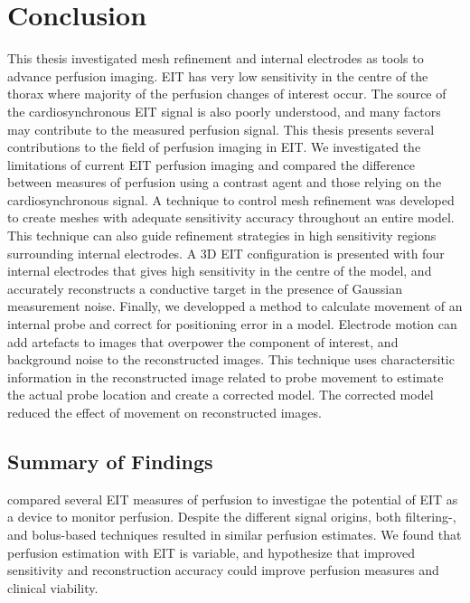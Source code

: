 \chapter{Conclusion}

This thesis investigated mesh refinement and internal electrodes 
as tools to advance perfusion imaging. 
EIT has very low sensitivity in the centre of the thorax where 
majority of the perfusion changes of interest occur. 
The source of the cardiosynchronous EIT signal is also 
poorly understood, and many factors may contribute to 
the measured perfusion signal. 
This thesis presents several contributions to the field of 
perfusion imaging in EIT.
We investigated the limitations of current EIT perfusion imaging
and compared the difference between measures of perfusion using 
a contrast agent and those relying on the cardiosynchronous signal.
A technique to control mesh refinement was developed to create meshes
with adequate sensitivity accuracy throughout an entire model. This 
technique can also guide refinement strategies in high sensitivity regions  
surrounding internal electrodes. 
A 3D EIT configuration is presented with four internal electrodes that gives high
sensitivity in the centre of the model, and accurately reconstructs a conductive
target in the presence of Gaussian measurement noise.
Finally, we developped a method to calculate movement of 
an internal probe and correct for positioning error in a model. Electrode 
motion can add artefacts
to images that overpower the 
component of interest, and background noise to the reconstructed images. 
This technique uses charactersitic information in the reconstructed 
image related to probe movement to estimate the actual probe location 
and create a corrected model. The corrected model 
reduced the effect of movement on reconstructed images. 

\section{Summary of Findings}

 compared several EIT measures of perfusion 
to investigae the potential of EIT as a device to monitor 
perfusion. 
Despite the different signal origins, both filtering-, and bolus-based 
techniques 
resulted in similar perfusion estimates. We found that perfusion 
estimation with EIT is variable, and hypothesize that 
improved sensitivity and reconstruction accuracy could improve perfusion 
measures and clinical viability. 

